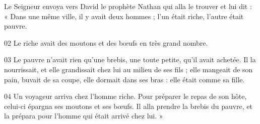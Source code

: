 Le Seigneur envoya vers David le prophète Nathan qui alla le trouver et lui dit : « Dans une même ville, il y avait deux hommes ; l’un était riche, l’autre était pauvre.

02 Le riche avait des moutons et des bœufs en très grand nombre.

03 Le pauvre n’avait rien qu’une brebis, une toute petite, qu’il avait achetée. Il la nourrissait, et elle grandissait chez lui au milieu de ses fils ; elle mangeait de son pain, buvait de sa coupe, elle dormait dans ses bras : elle était comme sa fille.

04 Un voyageur arriva chez l’homme riche. Pour préparer le repas de son hôte, celui-ci épargna ses moutons et ses bœufs. Il alla prendre la brebis du pauvre, et la prépara pour l’homme qui était arrivé chez lui. »

